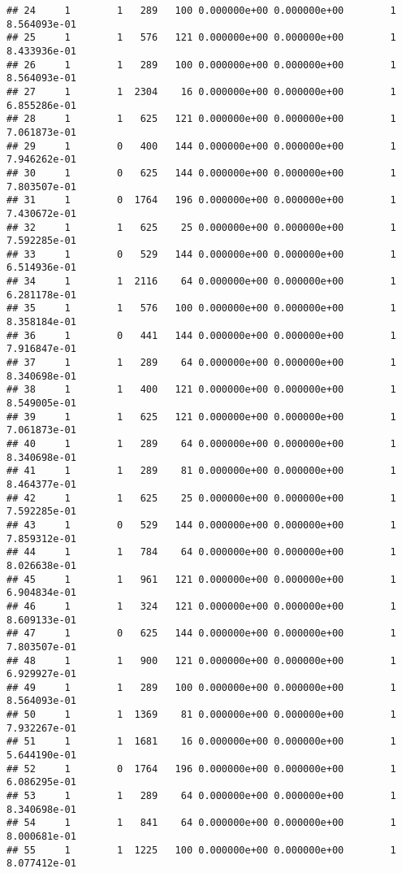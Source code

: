 \documentclass[
]{article}
\begin{document}
\begin{enumerate}
\begin{verbatim}
## 24     1        1   289   100 0.000000e+00 0.000000e+00        1  8.564093e-01
## 25     1        1   576   121 0.000000e+00 0.000000e+00        1  8.433936e-01
## 26     1        1   289   100 0.000000e+00 0.000000e+00        1  8.564093e-01
## 27     1        1  2304    16 0.000000e+00 0.000000e+00        1  6.855286e-01
## 28     1        1   625   121 0.000000e+00 0.000000e+00        1  7.061873e-01
## 29     1        0   400   144 0.000000e+00 0.000000e+00        1  7.946262e-01
## 30     1        0   625   144 0.000000e+00 0.000000e+00        1  7.803507e-01
## 31     1        0  1764   196 0.000000e+00 0.000000e+00        1  7.430672e-01
## 32     1        1   625    25 0.000000e+00 0.000000e+00        1  7.592285e-01
## 33     1        0   529   144 0.000000e+00 0.000000e+00        1  6.514936e-01
## 34     1        1  2116    64 0.000000e+00 0.000000e+00        1  6.281178e-01
## 35     1        1   576   100 0.000000e+00 0.000000e+00        1  8.358184e-01
## 36     1        0   441   144 0.000000e+00 0.000000e+00        1  7.916847e-01
## 37     1        1   289    64 0.000000e+00 0.000000e+00        1  8.340698e-01
## 38     1        1   400   121 0.000000e+00 0.000000e+00        1  8.549005e-01
## 39     1        1   625   121 0.000000e+00 0.000000e+00        1  7.061873e-01
## 40     1        1   289    64 0.000000e+00 0.000000e+00        1  8.340698e-01
## 41     1        1   289    81 0.000000e+00 0.000000e+00        1  8.464377e-01
## 42     1        1   625    25 0.000000e+00 0.000000e+00        1  7.592285e-01
## 43     1        0   529   144 0.000000e+00 0.000000e+00        1  7.859312e-01
## 44     1        1   784    64 0.000000e+00 0.000000e+00        1  8.026638e-01
## 45     1        1   961   121 0.000000e+00 0.000000e+00        1  6.904834e-01
## 46     1        1   324   121 0.000000e+00 0.000000e+00        1  8.609133e-01
## 47     1        0   625   144 0.000000e+00 0.000000e+00        1  7.803507e-01
## 48     1        1   900   121 0.000000e+00 0.000000e+00        1  6.929927e-01
## 49     1        1   289   100 0.000000e+00 0.000000e+00        1  8.564093e-01
## 50     1        1  1369    81 0.000000e+00 0.000000e+00        1  7.932267e-01
## 51     1        1  1681    16 0.000000e+00 0.000000e+00        1  5.644190e-01
## 52     1        0  1764   196 0.000000e+00 0.000000e+00        1  6.086295e-01
## 53     1        1   289    64 0.000000e+00 0.000000e+00        1  8.340698e-01
## 54     1        1   841    64 0.000000e+00 0.000000e+00        1  8.000681e-01
## 55     1        1  1225   100 0.000000e+00 0.000000e+00        1  8.077412e-01

\end{verbatim}
\end{enumerate}
\end{document}
